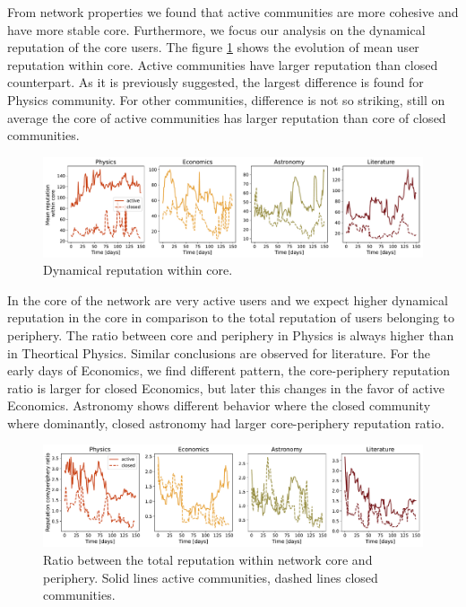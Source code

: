 From network properties we found that active communities are more cohesive and have more stable core. Furthermore, we focus our analysis on the dynamical reputation of the core users. The figure \ref{fig:dr_core} shows the evolution of mean user reputation within core. Active communities have larger reputation than closed counterpart. As it is previously suggested, the largest difference is found for Physics community. For other communities, difference is not so striking, still on average the core of active communities has larger reputation than core of closed communities. 

\begin{figure}[h]
	\centering
	\includegraphics[width=\linewidth]{figures/stackexchange/core_reputation.pdf}
	\caption{Dynamical reputation within core.}
	\label{fig:dr_core}
\end{figure}

In the core of the network are very active users and we expect higher dynamical reputation in the core in comparison to the total reputation of users belonging to periphery. The ratio between core and periphery in Physics is always higher than in Theortical Physics. Similar conclusions are observed for literature. For the early days of Economics, we find different pattern, the core-periphery reputation ratio is larger for closed Economics, but later this changes in the favor of active Economics. Astronomy shows different behavior where the closed community where dominantly, closed astronomy had larger core-periphery reputation ratio. 

\begin{figure}[h!]
	\centering
	\includegraphics[width=\linewidth]{figures/stackexchange/core_per_ratio_reputation.pdf}
	\caption{Ratio between the total reputation within network core and periphery. Solid lines active communities, dashed lines closed communities.}
	\label{fig:dr_core_per}
\end{figure}

